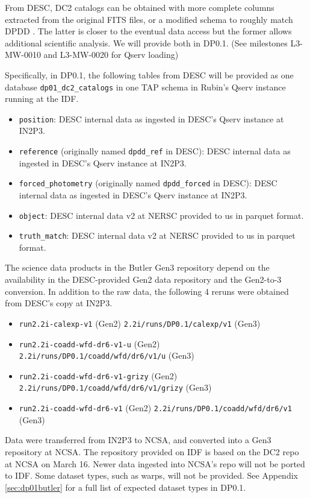 From DESC, DC2 catalogs can be obtained with more complete columns extracted from the original FITS files, or a modified schema to roughly match DPDD .
The latter is closer to the eventual data access but the former allows additional scientific analysis.
We will provide both in DP0.1. (See milestones L3-MW-0010 and L3-MW-0020 for Qserv loading)

Specifically, in DP0.1, the following tables from DESC will be provided as one database \texttt{dp01\_dc2\_catalogs} in one TAP schema in Rubin's Qserv instance running at the IDF.
\begin{itemize}
\item \texttt{position}: DESC internal data as ingested in DESC's Qserv instance at IN2P3.
\item \texttt{reference} (originally named \texttt{dpdd\_ref} in DESC): DESC internal data as ingested in DESC's Qserv instance at IN2P3.
\item \texttt{forced\_photometry} (originally named \texttt{dpdd\_forced} in DESC): DESC internal data as ingested in DESC's Qserv instance at IN2P3.
\item \texttt{object}: DESC internal data v2 at NERSC provided to us in parquet format.
\item \texttt{truth\_match}: DESC internal data v2 at NERSC provided to us in parquet format.
\end{itemize}

The science data products in the Butler Gen3 repository depend on the availability in the DESC-provided Gen2 data repository and the Gen2-to-3 conversion.
In addition to the raw data, the following 4 reruns were obtained from DESC's copy at IN2P3.
\begin{itemize}
\item \texttt{run2.2i-calexp-v1} (Gen2) \texttt{2.2i/runs/DP0.1/calexp/v1} (Gen3)
\item \texttt{run2.2i-coadd-wfd-dr6-v1-u} (Gen2) \texttt{2.2i/runs/DP0.1/coadd/wfd/dr6/v1/u} (Gen3)
\item \texttt{run2.2i-coadd-wfd-dr6-v1-grizy} (Gen2) \texttt{2.2i/runs/DP0.1/coadd/wfd/dr6/v1/grizy} (Gen3)
\item \texttt{run2.2i-coadd-wfd-dr6-v1} (Gen2) \texttt{2.2i/runs/DP0.1/coadd/wfd/dr6/v1} (Gen3)
\end{itemize}

Data were transferred from IN2P3 to NCSA, and converted into a Gen3 repository at NCSA.
The repository provided on IDF is based on the DC2 repo at NCSA on March 16.
Newer data ingested into NCSA's repo will not be ported to IDF.
Some dataset types, such as warps, will not be provided.
See Appendix \ref{sec:dp01butler} for a full list of expected dataset types in DP0.1.


